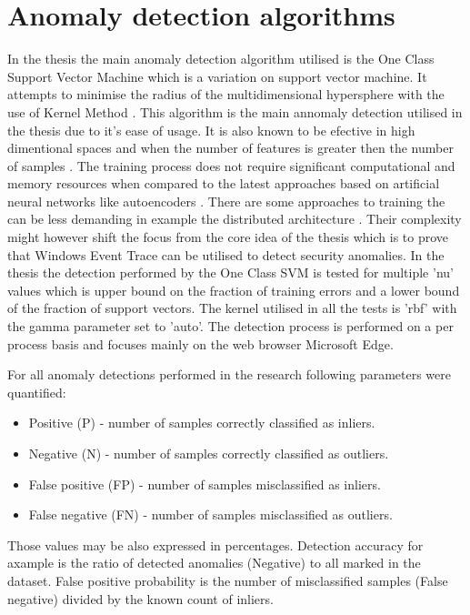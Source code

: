 \documentclass[a4paper,twoside,12pt]{book}
\begin{document}
\section{Anomaly detection algorithms}
In the thesis the main anomaly detection algorithm utilised is the One Class Support 
Vector Machine which is a variation on support vector machine. It attempts to minimise 
the radius of the multidimensional hypersphere with the use of Kernel Method \cite{bib:ocsvm}. 
This algorithm is the main annomaly detection utilised in the thesis due to it's ease of
usage. It is also known to be efective in high dimentional spaces and when 
the number of features is greater then the number of samples \cite{bib:svms}. The training process 
does not require significant computational and memory resources when compared to the latest
approaches based on artificial neural networks like autoencoders \cite{bib:autoencoder}. There are
some approaches to training the can be less demanding in example the distributed architecture
\cite{bib:autoencoderDist}. Their complexity might however shift the focus from the core idea 
of the thesis which is to prove that Windows Event Trace can be utilised to detect security
anomalies. In the thesis the detection performed by the One Class SVM is tested for multiple 'nu'
values which is upper bound on the fraction of training errors and a lower bound of the 
fraction of support vectors\cite{bib:skocsvm}. The kernel utilised in all the tests is 'rbf' with
the gamma parameter set to 'auto'. The detection process is performed 
on a per process basis and focuses mainly on the web browser Microsoft Edge. 

For all anomaly detections performed in the research following parameters were quantified:
\begin{itemize}
	\item Positive (P) - number of samples correctly classified as inliers.
	\item Negative (N) - number of samples correctly classified as outliers.
	\item False positive (FP) - number of samples misclassified as inliers. 
	\item False negative (FN) - number of samples misclassified as outliers.
\end{itemize}

Those values may be also expressed in percentages. Detection accuracy for axample is the ratio
of detected anomalies (Negative) to all marked in the dataset. False positive probability is 
the number of misclassified samples (False negative) divided by the known count of inliers.  
\end{document}
